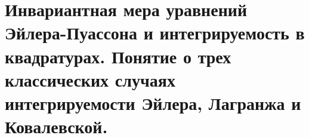 \section{Инвариантная мера уравнений Эйлера-Пуассона и интегрируемость в квадратурах. Понятие о трех классических случаях интегрируемости Эйлера, Лагранжа и Ковалевской.}\label{chasec14}



\newpage